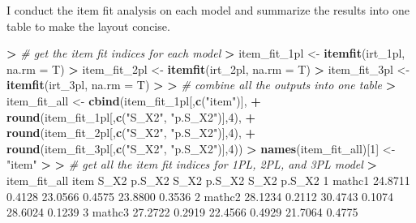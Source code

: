 \documentclass[
]{article}
\newenvironment{Shaded}{\begin{snugshade}}{\end{snugshade}}
\newcommand{\AttributeTok}[1]{\textcolor[rgb]{0.13,0.29,0.53}{#1}}
\newcommand{\CommentTok}[1]{\textcolor[rgb]{0.56,0.35,0.01}{\textit{#1}}}
\newcommand{\DecValTok}[1]{\textcolor[rgb]{0.00,0.00,0.81}{#1}}
\newcommand{\ErrorTok}[1]{\textcolor[rgb]{0.64,0.00,0.00}{\textbf{#1}}}
\newcommand{\FloatTok}[1]{\textcolor[rgb]{0.00,0.00,0.81}{#1}}
\newcommand{\FunctionTok}[1]{\textcolor[rgb]{0.13,0.29,0.53}{\textbf{#1}}}
\newcommand{\NormalTok}[1]{#1}
\newcommand{\OtherTok}[1]{\textcolor[rgb]{0.56,0.35,0.01}{#1}}
\newcommand{\SpecialCharTok}[1]{\textcolor[rgb]{0.81,0.36,0.00}{\textbf{#1}}}
\newcommand{\StringTok}[1]{\textcolor[rgb]{0.31,0.60,0.02}{#1}}
\begin{document}
I conduct the item fit analysis on each model and summarize the results
into one table to make the layout concise.

\begin{Shaded}
\begin{Highlighting}[]
\SpecialCharTok{\textgreater{}} \CommentTok{\# get the item fit indices for each model}
\ErrorTok{\textgreater{}}\NormalTok{ item\_fit\_1pl }\OtherTok{\textless{}{-}} \FunctionTok{itemfit}\NormalTok{(irt\_1pl, }\AttributeTok{na.rm =}\NormalTok{ T)}
\SpecialCharTok{\textgreater{}}\NormalTok{ item\_fit\_2pl }\OtherTok{\textless{}{-}} \FunctionTok{itemfit}\NormalTok{(irt\_2pl, }\AttributeTok{na.rm =}\NormalTok{ T)}
\SpecialCharTok{\textgreater{}}\NormalTok{ item\_fit\_3pl }\OtherTok{\textless{}{-}} \FunctionTok{itemfit}\NormalTok{(irt\_3pl, }\AttributeTok{na.rm =}\NormalTok{ T)}
\SpecialCharTok{\textgreater{}} 
\ErrorTok{\textgreater{}} \CommentTok{\# combine all the outputs into one table}
\ErrorTok{\textgreater{}}\NormalTok{ item\_fit\_all }\OtherTok{\textless{}{-}} \FunctionTok{cbind}\NormalTok{(item\_fit\_1pl[,}\FunctionTok{c}\NormalTok{(}\StringTok{"item"}\NormalTok{)],}
\SpecialCharTok{+}                       \FunctionTok{round}\NormalTok{(item\_fit\_1pl[,}\FunctionTok{c}\NormalTok{(}\StringTok{"S\_X2"}\NormalTok{, }\StringTok{"p.S\_X2"}\NormalTok{)],}\DecValTok{4}\NormalTok{),}
\SpecialCharTok{+}                       \FunctionTok{round}\NormalTok{(item\_fit\_2pl[,}\FunctionTok{c}\NormalTok{(}\StringTok{"S\_X2"}\NormalTok{, }\StringTok{"p.S\_X2"}\NormalTok{)],}\DecValTok{4}\NormalTok{),}
\SpecialCharTok{+}                       \FunctionTok{round}\NormalTok{(item\_fit\_3pl[,}\FunctionTok{c}\NormalTok{(}\StringTok{"S\_X2"}\NormalTok{, }\StringTok{"p.S\_X2"}\NormalTok{)],}\DecValTok{4}\NormalTok{))}
\SpecialCharTok{\textgreater{}} \FunctionTok{names}\NormalTok{(item\_fit\_all)[}\DecValTok{1}\NormalTok{] }\OtherTok{\textless{}{-}} \StringTok{"item"}
\SpecialCharTok{\textgreater{}} 
\ErrorTok{\textgreater{}} \CommentTok{\# get all the item fit indices for 1PL, 2PL, and 3PL model}
\ErrorTok{\textgreater{}}\NormalTok{ item\_fit\_all}
\NormalTok{      item     S\_X2 p.S\_X2    S\_X2 p.S\_X2    S\_X2 p.S\_X2}
\DecValTok{1}\NormalTok{   mathc1  }\FloatTok{24.8711} \FloatTok{0.4128} \FloatTok{23.0566} \FloatTok{0.4575} \FloatTok{23.8800} \FloatTok{0.3536}
\DecValTok{2}\NormalTok{   mathc2  }\FloatTok{28.1234} \FloatTok{0.2112} \FloatTok{30.4743} \FloatTok{0.1074} \FloatTok{28.6024} \FloatTok{0.1239}
\DecValTok{3}\NormalTok{   mathc3  }\FloatTok{27.2722} \FloatTok{0.2919} \FloatTok{22.4566} \FloatTok{0.4929} \FloatTok{21.7064} \FloatTok{0.4775}

\end{Highlighting}
\end{Shaded}
\end{document}
